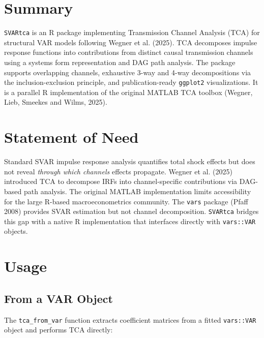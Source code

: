 \section{Summary}\label{summary}

\texttt{SVARtca} is an R package implementing Transmission Channel
Analysis (TCA) for structural VAR models following Wegner et al. (2025).
TCA decomposes impulse response functions into contributions from
distinct causal transmission channels using a systems form
representation and DAG path analysis. The package supports overlapping
channels, exhaustive 3-way and 4-way decompositions via the
inclusion-exclusion principle, and publication-ready \texttt{ggplot2}
visualizations. It is a parallel R implementation of the original MATLAB
TCA toolbox (Wegner, Lieb, Smeekes and Wilms, 2025).

\section{Statement of Need}\label{statement-of-need}

Standard SVAR impulse response analysis quantifies total shock effects
but does not reveal \emph{through which channels} effects propagate.
Wegner et al. (2025) introduced TCA to decompose IRFs into
channel-specific contributions via DAG-based path analysis. The original
MATLAB implementation limits accessibility for the large R-based
macroeconometrics community. The \texttt{vars} package (Pfaff 2008)
provides SVAR estimation but not channel decomposition. \texttt{SVARtca}
bridges this gap with a native R implementation that interfaces directly
with \texttt{vars::VAR} objects.

\section{Usage}\label{usage}

\subsection{From a VAR Object}\label{from-a-var-object}

The \texttt{tca\_from\_var} function extracts coefficient matrices from
a fitted \texttt{vars::VAR} object and performs TCA directly:

